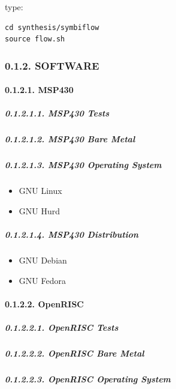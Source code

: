 \documentclass[
]{article}
\begin{document}
type:

\begin{verbatim}
cd synthesis/symbiflow
source flow.sh
\end{verbatim}

\hypertarget{software-1}{%
\subsubsection{0.1.2. SOFTWARE}\label{software-1}}

\hypertarget{msp430-3}{%
\paragraph{0.1.2.1. MSP430}\label{msp430-3}}

\hypertarget{msp430-tests-1}{%
\subparagraph{0.1.2.1.1. MSP430 Tests}\label{msp430-tests-1}}

\hypertarget{msp430-bare-metal-1}{%
\subparagraph{0.1.2.1.2. MSP430 Bare Metal}\label{msp430-bare-metal-1}}

\hypertarget{msp430-operating-system-1}{%
\subparagraph{0.1.2.1.3. MSP430 Operating
System}\label{msp430-operating-system-1}}

\begin{itemize}
\item
  GNU Linux
\item
  GNU Hurd
\end{itemize}

\hypertarget{msp430-distribution-1}{%
\subparagraph{0.1.2.1.4. MSP430
Distribution}\label{msp430-distribution-1}}

\begin{itemize}
\item
  GNU Debian
\item
  GNU Fedora
\end{itemize}

\hypertarget{openrisc-3}{%
\paragraph{0.1.2.2. OpenRISC}\label{openrisc-3}}

\hypertarget{openrisc-tests-1}{%
\subparagraph{0.1.2.2.1. OpenRISC Tests}\label{openrisc-tests-1}}

\hypertarget{openrisc-bare-metal-1}{%
\subparagraph{0.1.2.2.2. OpenRISC Bare
Metal}\label{openrisc-bare-metal-1}}

\hypertarget{openrisc-operating-system-1}{%
\subparagraph{0.1.2.2.3. OpenRISC Operating
System}\label{openrisc-operating-system-1}}
\end{document}
